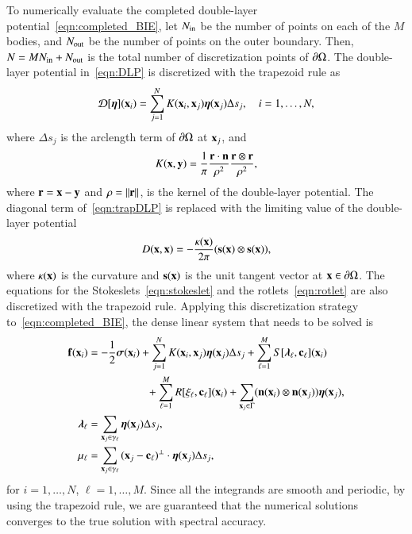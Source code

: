 \documentclass[preprint, 10pt]{elsarticle}
\begin{document}
To numerically evaluate the completed double-layer
potential~\eqref{eqn:completed_BIE}, let $N_{\mathrm{in}}$ be the number of
points on each of the $M$ bodies, and $N_{\mathrm{out}}$ be the number of points
on the outer boundary.  Then, $N = MN_{\mathrm{in}} + N_{\mathrm{out}}$ is the total number
of discretization points of ${\partial}\Omega$.  The double-layer potential
in~\eqref{eqn:DLP} is discretized with the trapezoid rule as
\begin{align}
  {\mathcal{D}}[{\boldsymbol\eta}]({\mathbf{x}}_i) = \sum_{j=1}^{N} K({\mathbf{x}}_i,{\mathbf{x}}_j) {\boldsymbol\eta}({\mathbf{x}}_j) 
      \Delta s_{j}, \quad i=1,\ldots,N,
  \label{eqn:trapDLP}
\end{align}
where $\Delta s_j$ is the arclength term of ${\partial}\Omega$ at
${\mathbf{x}}_j$, and
\begin{align*}
  K({\mathbf{x}},{\mathbf{y}}) = \frac{1}{\pi} \frac{{\mathbf{r}} \cdot {\mathbf{n}}}{\rho^2} 
      \frac{{\mathbf{r}} \otimes {\mathbf{r}}}{\rho^2},
\end{align*}
where ${\mathbf{r}} = {\mathbf{x}} - {\mathbf{y}}$ and $\rho = \|{\mathbf{r}}\|$, is the kernel of the
double-layer potential.  The diagonal term of~\eqref{eqn:trapDLP} is
replaced with the limiting value of the double-layer potential
\begin{align*}
  D({\mathbf{x}},{\mathbf{x}}) = -\frac{\kappa({\mathbf{x}})}{2\pi}({\mathbf{s}}({\mathbf{x}}) \otimes {\mathbf{s}}({\mathbf{x}})),
\end{align*}
where $\kappa({\mathbf{x}})$ is the curvature and ${\mathbf{s}}({\mathbf{x}})$ is the unit tangent
vector at ${\mathbf{x}} \in {\partial}\Omega$.  The equations for the
Stokeslets~\eqref{eqn:stokeslet} and the rotlets~\eqref{eqn:rotlet} are
also discretized with the trapezoid rule.  Applying this discretization
strategy to~\eqref{eqn:completed_BIE}, the dense linear system that
needs to be solved is
\begin{equation}
  \label{eqn:completed_BIE_discretized}
  \begin{aligned}
    {\mathbf{f}}({\mathbf{x}}_i) &= -\frac{1}{2}{\boldsymbol\sigma}({\mathbf{x}}_i) + \sum_{j=1}^{N} 
      K({\mathbf{x}}_i,{\mathbf{x}}_j) {\boldsymbol\eta}({\mathbf{x}}_j) \Delta s_{j} + 
      \sum_{\ell=1}^M S[{\boldsymbol\lambda}_\ell,{\mathbf{c}}_\ell]({\mathbf{x}}_i) \\
      &\hspace{53pt}
      +\sum_{\ell=1}^M R[\xi_\ell,{\mathbf{c}}_\ell]({\mathbf{x}}_i) 
      +\sum_{{\mathbf{x}}_j \in \Gamma} ({\mathbf{n}}({\mathbf{x}}_i) \otimes
      {\mathbf{n}}({\mathbf{x}}_j)){\boldsymbol\eta}({\mathbf{x}}_j), \\
    {\boldsymbol\lambda}_\ell &= \sum_{{\mathbf{x}}_j \in \gamma_\ell} {\boldsymbol\eta}({\mathbf{x}}_j) 
      \Delta s_j, \\ 
    \mu_\ell &= \sum_{{\mathbf{x}}_j \in \gamma_\ell}
      {({\mathbf{x}}_j - {\mathbf{c}}_\ell)}^\perp \cdot {\boldsymbol\eta}({\mathbf{x}}_j) \Delta s_j,
  \end{aligned}
\end{equation}
for $i=1,\ldots,N$, $\ell=1,\ldots,M$.  Since all the integrands are
smooth and periodic, by using the trapezoid rule, we are guaranteed that
the numerical solutions converges to the true solution with spectral
accuracy.
\end{document}
